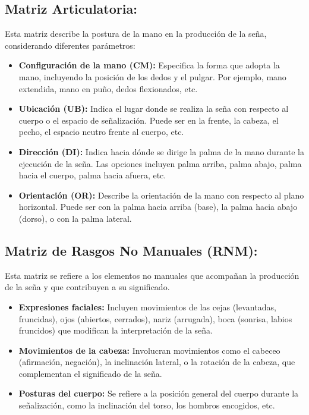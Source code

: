 \subsection{Matriz Articulatoria:}

Esta matriz describe la postura de la mano en la producción de la seña, considerando diferentes parámetros:

\begin{itemize}
    \item \textbf{Configuración de la mano (CM):} Especifica la forma que adopta la mano, incluyendo la posición de los dedos y el pulgar.  Por ejemplo, mano extendida, mano en puño, dedos flexionados, etc.

    \item \textbf{Ubicación (UB):} Indica el lugar donde se realiza la seña con respecto al cuerpo o el espacio de señalización. Puede ser en la frente, la cabeza, el pecho, el espacio neutro frente al cuerpo, etc.

    \item \textbf{Dirección (DI):} Indica hacia dónde se dirige la palma de la mano durante la ejecución de la seña.  Las opciones incluyen palma arriba, palma abajo, palma hacia el cuerpo, palma hacia afuera, etc.

    \item \textbf{Orientación (OR):} Describe la orientación de la mano con respecto al plano horizontal.  Puede ser con la palma hacia arriba (base), la palma hacia abajo (dorso), o con la palma lateral.
\end{itemize}

\subsection{Matriz de Rasgos No Manuales (RNM):}

Esta matriz se refiere a los elementos no manuales que acompañan la producción de la seña y que contribuyen a su significado.

\begin{itemize}
    \item \textbf{Expresiones faciales:} Incluyen movimientos de las cejas (levantadas, fruncidas), ojos (abiertos, cerrados), nariz (arrugada), boca (sonrisa, labios fruncidos) que modifican la interpretación de la seña.

    \item \textbf{Movimientos de la cabeza:}  Involucran movimientos como el cabeceo (afirmación, negación), la inclinación lateral, o la rotación de la cabeza, que complementan el significado de la seña.

    \item \textbf{Posturas del cuerpo:} Se refiere a la posición general del cuerpo durante la señalización, como la inclinación del torso, los hombros encogidos, etc.
\end{itemize}


